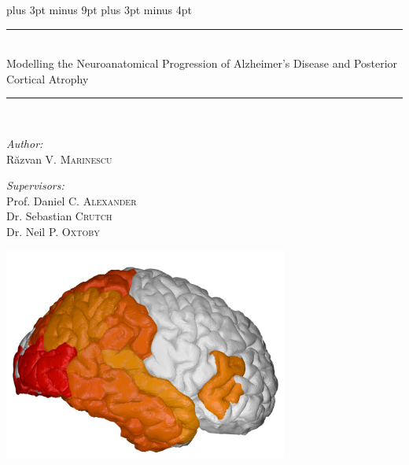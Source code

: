 \documentclass[12pt,a4paper,twoside]{book}
\newcommand{\HRule}{\rule{\linewidth}{0.5mm}}
\newcommand{\FrontPageStyle}{\pagestyle{empty}}
\begin{document}
\belowdisplayskip=12pt plus 3pt minus 9pt
\belowdisplayshortskip=7pt plus 3pt minus 4pt

\sloppy

\FrontPageStyle{}

\begin{titlepage}
\begin{center}

% 
% 

{\Large 

\HRule \\[0.4cm]
{ \LARGE Modelling the Neuroanatomical Progression of Alzheimer's Disease and Posterior Cortical Atrophy\\[0.4cm] }

\HRule \\[1.5cm]

\begin{minipage}{0.4\textwidth}
\begin{flushleft} \Large
\emph{Author:}\\
R\u{a}zvan V. \textsc{Marinescu}
\end{flushleft}
\end{minipage}
\begin{minipage}{0.5\textwidth}
\begin{flushright} \Large
\emph{Supervisors:} \\
Prof. Daniel C. \textsc{Alexander}\\
Dr. Sebastian \textsc{Crutch}\\
Dr. Neil P. \textsc{Oxtoby} 
\end{flushright}
\end{minipage}


\vfill

\includegraphics[height=7cm]{images/cortical_1}

}
\end{center}
\end{titlepage}
\end{document}
